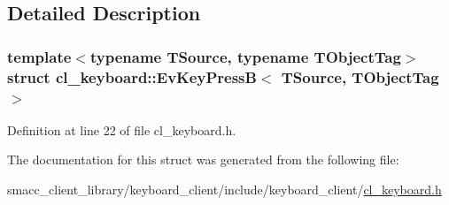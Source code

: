 \subsection{Detailed Description}
\subsubsection*{template$<$typename T\+Source, typename T\+Object\+Tag$>$\newline
struct cl\+\_\+keyboard\+::\+Ev\+Key\+Press\+B$<$ T\+Source, T\+Object\+Tag $>$}



Definition at line 22 of file cl\+\_\+keyboard.\+h.



The documentation for this struct was generated from the following file\+:\begin{DoxyCompactItemize}
\item 
smacc\+\_\+client\+\_\+library/keyboard\+\_\+client/include/keyboard\+\_\+client/\hyperlink{cl__keyboard_8h}{cl\+\_\+keyboard.\+h}\end{DoxyCompactItemize}
